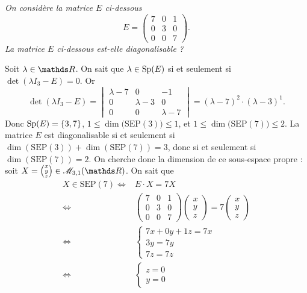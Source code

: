 \begin{exo}
	{\slshape On considère la matrice $E$\/ ci-dessous \[
		E = \begin{pmatrix}
			7&0&1\\
			0&3&0\\
			0&0&7
		\end{pmatrix}.
	\] La matrice $E$\/ ci-dessous est-elle diagonalisable ?}

	Soit $\lambda \in \R$. On sait que $\lambda \in \operatorname{Sp}(E)$\/ si et seulement si $\det(\lambda I_3 - E) = 0$. Or \[
		\det(\lambda I_3 - E) =
		\begin{vmatrix}
			\lambda - 7&0&-1\\
			0&\lambda-3&0\\
			0&0&\lambda - 7
		\end{vmatrix} = (\lambda - 7)^2\cdot  (\lambda - 3)^1
	.\] Donc $\operatorname{Sp}(E) = \{3,7\}$, $1 \le \dim\big(\mathrm{SEP}(3)\big) \le 1$, et $1 \le \dim\big(\mathrm{SEP}(7)\big) \le 2$.
	La matrice $E$\/ est diagonalisable si et seulement si $\dim(\mathrm{SEP}(3)) + \dim(\mathrm{SEP}(7)) = 3$, donc si et seulement si $\dim(\mathrm{SEP}(7)) = 2$. On cherche donc la dimension de ce sous-espace propre : soit $X = \left( \substack{x\\y\\z} \right) \in \mathscr{M}_{3,1}(\R)$. On sait que
	\begin{align*}
		X \in \mathrm{SEP}(7) \iff& E\cdot X = 7X\\
		\iff& \begin{pmatrix}
			7&0&1\\
			0&3&0\\
			0&0&7
		\end{pmatrix} \begin{pmatrix}
			x\\y\\z
		\end{pmatrix} = 7 \begin{pmatrix}
			x\\y\\z
		\end{pmatrix}\\
		\iff& \begin{cases}
			7x + 0y + 1z = 7x\\
			3y = 7y\\
			7z = 7z
		\end{cases}\\
		\iff& \begin{cases}
			z = 0\\
			y = 0

\end{cases}
\end{align*}
\end{exo}
